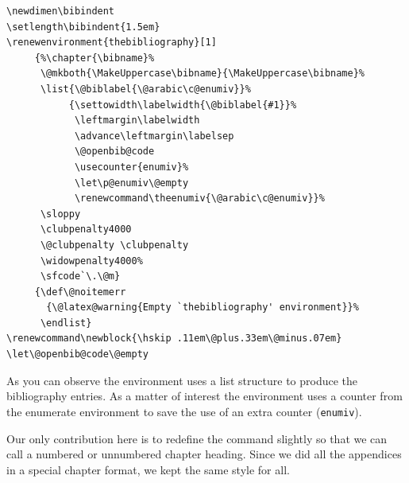 \begin{tcolorbox}[title=LaTeX default thebibliography environment.]
\begin{lstlisting}
\newdimen\bibindent
\setlength\bibindent{1.5em}
\renewenvironment{thebibliography}[1]
     {%\chapter{\bibname}%
      \@mkboth{\MakeUppercase\bibname}{\MakeUppercase\bibname}%
      \list{\@biblabel{\@arabic\c@enumiv}}%
           {\settowidth\labelwidth{\@biblabel{#1}}%
            \leftmargin\labelwidth
            \advance\leftmargin\labelsep
            \@openbib@code
            \usecounter{enumiv}%
            \let\p@enumiv\@empty
            \renewcommand\theenumiv{\@arabic\c@enumiv}}%
      \sloppy
      \clubpenalty4000
      \@clubpenalty \clubpenalty
      \widowpenalty4000%
      \sfcode`\.\@m}
     {\def\@noitemerr
       {\@latex@warning{Empty `thebibliography' environment}}%
      \endlist}
\renewcommand\newblock{\hskip .11em\@plus.33em\@minus.07em}
\let\@openbib@code\@empty
\end{lstlisting}
\end{tcolorbox}

As you can observe the environment uses a list structure to produce the bibliography entries. As a matter of interest the environment uses a counter from the enumerate environment to save the use of an extra counter (\texttt{enumiv})\cite{source2e}.

Our only contribution here is to redefine the command slightly so that we can call a numbered or unnumbered chapter heading. Since we did all the appendices in a special chapter format, we kept the same style for all.\cite{companion}




